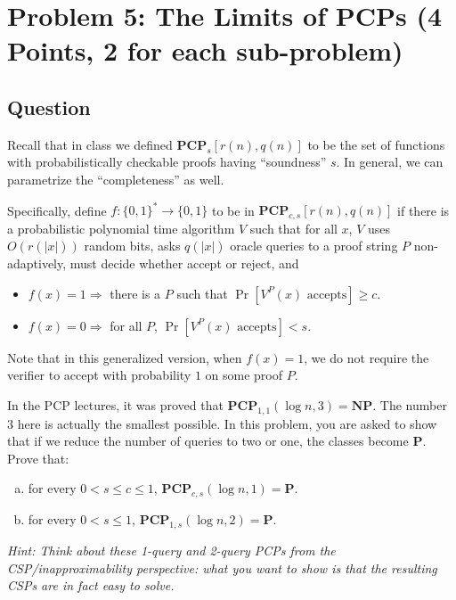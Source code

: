 \documentclass{article}
\newcommand{\mf}[1]{\mathbf{#1}}
\begin{document}





\newpage
\section*{Problem 5: The Limits of PCPs (4 Points, 2 for each sub-problem)}
\subsection*{Question}
Recall that in class we defined $\mf{PCP}_s[r(n),q(n)]$ to be the set of functions with probabilistically checkable proofs having ``soundness'' $s$. In general, we can parametrize the ``completeness'' as well. 

Specifically, define $f:\{0,1\}^* \rightarrow \{0,1\}$ to be in $\mf{PCP}_{c,s}[r(n),q(n)]$ if there is a probabilistic polynomial time algorithm $V$ such that for all $x$, $V$ uses $O(r(|x|))$ random bits, asks $q(|x|)$ oracle queries to a proof string $P$ non-adaptively, must decide whether accept or reject, and
\begin{itemize}
	\item
	$f(x) = 1 \Longrightarrow$ there is a $P$ such that $\Pr[V^P(x) \textrm{ accepts}] \geq c$.
	\item
	$f(x) = 0 \Longrightarrow$ for all $P$, $\Pr[V^P(x) \textrm{ accepts}] < s$.
\end{itemize}

Note that in this generalized version, when $f(x) = 1$, we do not require the verifier to accept with probability $1$ on some proof $P$. 

In the PCP lectures, it was proved that $\mf{PCP}_{1,1}(\log n, 3)=\mathbf{NP}$. The number $3$ here is actually the smallest possible. In this problem, you are asked to show that if we reduce the number of queries to two or one, the classes become $\mathbf{P}$. Prove that:
\begin{enumerate}[(a)]
	\item
	for every $0<s\leq  c\leq 1$, $\mf{PCP}_{c,s}(\log n,1)=\mathbf{P}$.
	\item
	for every $0<s\leq 1$, $\mf{PCP}_{1,s}(\log n,2)=\mathbf{P}$.
\end{enumerate} 
\emph{Hint: Think about these 1-query and 2-query PCPs from the CSP/inapproximability perspective: what you want to show is that the resulting CSPs are in fact easy to solve.}
\end{document}
